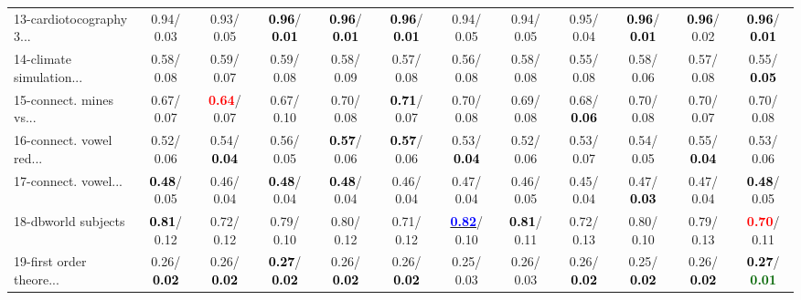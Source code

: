 \begin{table}[h]
\begin{center}
{\begin{tabular}{lc|c|c|c|c|c|c|c|c|c|c}
13-cardiotocography 3... &   0.94/  0.03 &   0.93/  0.05 & \textcolor{black}{\textbf{  0.96}}/\textcolor{black}{\textbf{  0.01}} & \textcolor{black}{\textbf{  0.96}}/\textcolor{black}{\textbf{  0.01}} & \textcolor{black}{\textbf{  0.96}}/\textcolor{black}{\textbf{  0.01}} &   0.94/  0.05 &   0.94/  0.05 &   0.95/  0.04 & \textcolor{black}{\textbf{  0.96}}/\textcolor{black}{\textbf{  0.01}} & \textcolor{black}{\textbf{  0.96}}/  0.02 & \textcolor{black}{\textbf{  0.96}}/\textcolor{black}{\textbf{  0.01}} \\
14-climate simulation... &   0.58/  0.08 &   0.59/  0.07 &   0.59/  0.08 &   0.58/  0.09 &   0.57/  0.08 &   0.56/  0.08 &   0.58/  0.08 &   0.55/  0.08 &   0.58/  0.06 &   0.57/  0.08 &   0.55/\textcolor{black}{\textbf{  0.05}} \\ \hline
15-connect. mines vs... &   0.67/  0.07 & \textcolor{red}{\textbf{  0.64}}/  0.07 &   0.67/  0.10 &   0.70/  0.08 & \textcolor{black}{\textbf{  0.71}}/  0.07 &   0.70/  0.08 &   0.69/  0.08 &   0.68/\textcolor{black}{\textbf{  0.06}} &   0.70/  0.08 &   0.70/  0.07 &   0.70/  0.08 \\
16-connect. vowel red... &   0.52/  0.06 &   0.54/\textcolor{black}{\textbf{  0.04}} &   0.56/  0.05 & \textcolor{black}{\textbf{  0.57}}/  0.06 & \textcolor{black}{\textbf{  0.57}}/  0.06 &   0.53/\textcolor{black}{\textbf{  0.04}} &   0.52/  0.06 &   0.53/  0.07 &   0.54/  0.05 &   0.55/\textcolor{black}{\textbf{  0.04}} &   0.53/  0.06 \\
17-connect. vowel... & \textcolor{black}{\textbf{  0.48}}/  0.05 &   0.46/  0.04 & \textcolor{black}{\textbf{  0.48}}/  0.04 & \textcolor{black}{\textbf{  0.48}}/  0.04 &   0.46/  0.04 &   0.47/  0.04 &   0.46/  0.05 &   0.45/  0.04 &   0.47/\textcolor{black}{\textbf{  0.03}} &   0.47/  0.04 & \textcolor{black}{\textbf{  0.48}}/  0.05 \\
18-dbworld subjects & \textcolor{black}{\textbf{  0.81}}/  0.12 &   0.72/  0.12 &   0.79/  0.10 &   0.80/  0.12 &   0.71/  0.12 & \underline{\textcolor{blue}{\textbf{  0.82}}}/  0.10 & \textcolor{black}{\textbf{  0.81}}/  0.11 &   0.72/  0.13 &   0.80/  0.10 &   0.79/  0.13 & \textcolor{red}{\textbf{  0.70}}/  0.11 \\
19-first order theore... &   0.26/\textcolor{black}{\textbf{  0.02}} &   0.26/\textcolor{black}{\textbf{  0.02}} & \textcolor{black}{\textbf{  0.27}}/\textcolor{black}{\textbf{  0.02}} &   0.26/\textcolor{black}{\textbf{  0.02}} &   0.26/\textcolor{black}{\textbf{  0.02}} &   0.25/  0.03 &   0.26/  0.03 &   0.26/\textcolor{black}{\textbf{  0.02}} &   0.25/\textcolor{black}{\textbf{  0.02}} &   0.26/\textcolor{black}{\textbf{  0.02}} & \textcolor{black}{\textbf{  0.27}}/\textcolor{darkgreen}{\textbf{  0.01}} \\

\end{tabular}}
\end{center}
\end{table}
